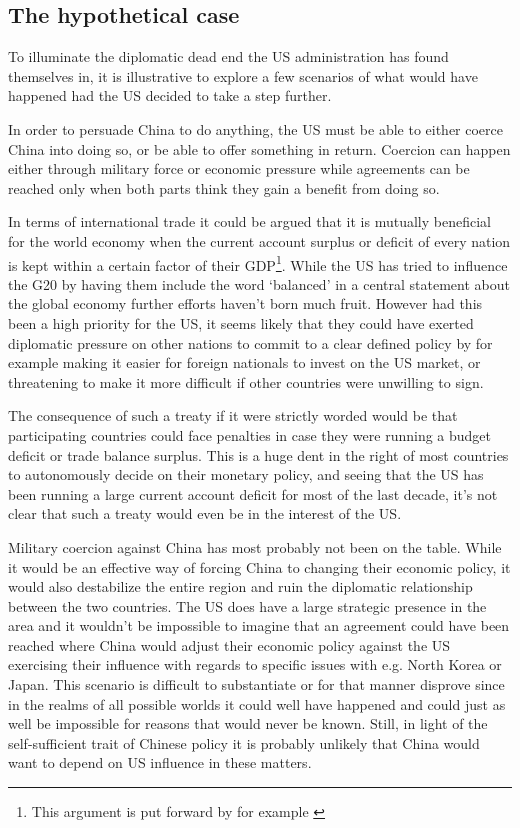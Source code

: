 \subsection{The hypothetical case}

To illuminate the diplomatic dead end the US administration has found 
themselves in, it is illustrative to explore a few scenarios of what 
would have happened had the US decided to take a step further.

In order to persuade China to do anything, the US must be able to either 
coerce China into doing so, or be able to offer something in return.  
Coercion can happen either through military force or economic pressure 
while agreements can be reached only when both parts think they gain a 
benefit from doing so.

In terms of international trade it could be argued that it is mutually 
beneficial for the world economy when the current account surplus or 
deficit of every nation is kept within a certain factor of their 
GDP\footnote{This argument is put forward by for example 
\cite{cline2009}}. While the US has tried to influence the G20 by having 
them include the word `balanced' in a central statement about the global 
economy further efforts haven't born much fruit. However had this been a 
high priority for the US, it seems likely that they could have exerted 
diplomatic pressure on other nations to commit to a clear defined policy 
by for example making it easier for foreign nationals to invest on the 
US market, or threatening to make it more difficult if other countries 
were unwilling to sign.

The consequence of such a treaty if it were strictly worded would be 
that participating countries could face penalties in case they were 
running a budget deficit or trade balance surplus.  This is a huge dent 
in the right of most countries to autonomously decide on their monetary 
policy, and seeing that the US has been running a large current account 
deficit for most of the last decade, it's not clear that such a treaty 
would even be in the interest of the US.

Military coercion against China has most probably not been on the table.  
While it would be an effective way of forcing China to changing their 
economic policy, it would also destabilize the entire region and ruin 
the diplomatic relationship between the two countries. The US does have 
a large strategic presence in the area and it wouldn't be impossible to 
imagine that an agreement could have been reached where China would 
adjust their economic policy against the US exercising their influence 
with regards to specific issues with e.g. North Korea or Japan. This 
scenario is difficult to substantiate or for that manner disprove since 
in the realms of all possible worlds it could well have happened and 
could just as well be impossible for reasons that would never be known.  
Still, in light of the self-sufficient trait of Chinese policy it is 
probably unlikely that China would want to depend on US influence in 
these matters.

